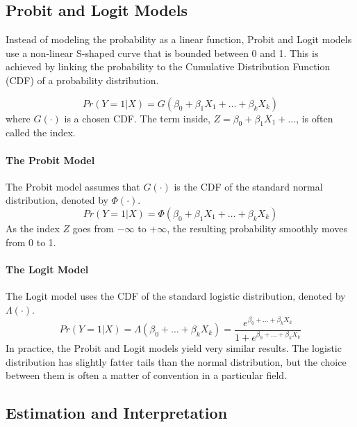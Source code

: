 \documentclass{article}
\begin{document}
\subsection{Probit and Logit Models}
\label{sub:probit_logit}

Instead of modeling the probability as a linear function, Probit and Logit models use a non-linear S-shaped curve that is bounded between 0 and 1. This is achieved by linking the probability to the Cumulative Distribution Function (CDF) of a probability distribution.

\begin{equation}
    Pr(Y=1|X) = G(\beta_0 + \beta_1 X_1 + \dots + \beta_k X_k)
\end{equation}
where $G(\cdot)$ is a chosen CDF. The term inside, $Z = \beta_0 + \beta_1 X_1 + \dots$, is often called the index.

\paragraph{The Probit Model}
The Probit model assumes that $G(\cdot)$ is the CDF of the standard normal distribution, denoted by $\Phi(\cdot)$.
\begin{equation}
    Pr(Y=1|X) = \Phi(\beta_0 + \beta_1 X_1 + \dots + \beta_k X_k)
\end{equation}
As the index $Z$ goes from $-\infty$ to $+\infty$, the resulting probability smoothly moves from 0 to 1.

\paragraph{The Logit Model}
The Logit model uses the CDF of the standard logistic distribution, denoted by $\Lambda(\cdot)$.
\begin{equation}
    Pr(Y=1|X) = \Lambda(\beta_0 + \dots + \beta_k X_k) = \frac{e^{\beta_0 + \dots + \beta_k X_k}}{1+e^{\beta_0 + \dots + \beta_k X_k}}
\end{equation}
In practice, the Probit and Logit models yield very similar results. The logistic distribution has slightly fatter tails than the normal distribution, but the choice between them is often a matter of convention in a particular field.

\subsection{Estimation and Interpretation}
\label{sub:ldv_interpretation}
\end{document}
